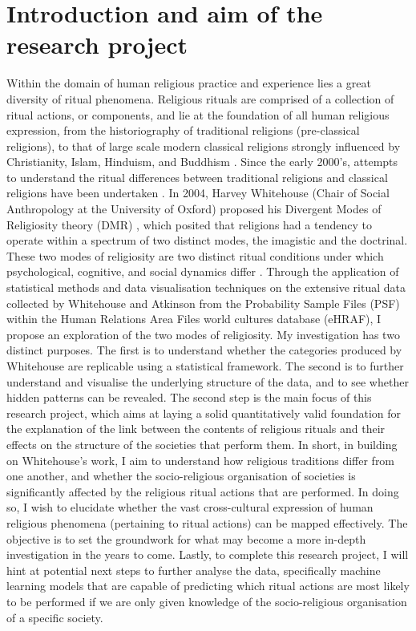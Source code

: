 \documentclass[12pt]{report}
\begin{document}
	\chapter*{Introduction and aim of the research project}
	Within the domain of human religious practice and experience lies a great diversity of ritual phenomena. Religious rituals are comprised of a collection of ritual actions, or components, and lie at the foundation of all human religious expression, from the historiography of traditional religions (pre-classical religions), to that of large scale modern classical religions strongly influenced by Christianity, Islam, Hinduism, and Buddhism \cite{atkinson2011}. Since the early 2000’s, attempts to understand the ritual differences between traditional religions and classical religions have been undertaken \cite{whitehouse2000}. In 2004, Harvey Whitehouse (Chair of Social Anthropology at the University of Oxford) proposed his Divergent Modes of Religiosity theory (DMR) \cite{whitehouse2004modes}, which posited that religions had a tendency to operate within a spectrum of two distinct modes, the imagistic and the doctrinal. These two modes of religiosity are two distinct ritual conditions under which psychological, cognitive, and social dynamics differ \cite{whitehouse2004modes}. Through the application of statistical methods and data visualisation techniques on the extensive ritual data collected by Whitehouse and Atkinson \cite{atkinson2011} from the Probability Sample Files (PSF) within the Human Relations Area Files world cultures database (eHRAF), I propose an exploration of the two modes of religiosity. My investigation has two distinct purposes. The first is to understand whether the categories produced by Whitehouse are replicable using a statistical framework. The second is to further understand and visualise the underlying structure of the data, and to see whether hidden patterns can be revealed. The second step is the main focus of this research project, which aims at laying a solid quantitatively valid foundation for the explanation of the link between the contents of religious rituals and their effects on the structure of the societies that perform them. In short, in building on Whitehouse’s work, I aim to understand how religious traditions differ from one another, and whether the socio-religious organisation of societies is significantly affected by the religious ritual actions that are performed. In doing so, I wish to elucidate whether the vast cross-cultural expression of human religious phenomena (pertaining to ritual actions) can be mapped effectively. The objective is to set the groundwork for what may become a more in-depth investigation in the years to come. Lastly, to complete this research project, I will hint at potential next steps to further analyse the data, specifically machine learning models that are capable of predicting which ritual actions are most likely to be performed if we are only given knowledge of the socio-religious organisation of a specific society.
	
\end{document}
